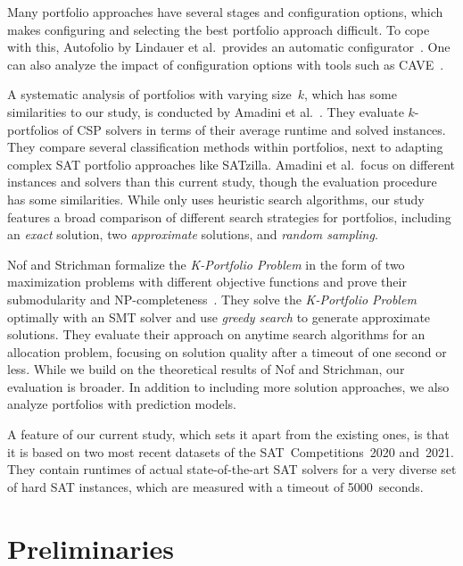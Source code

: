 \documentclass[conference]{IEEEtran}
\begin{document}
Many portfolio approaches have several stages and configuration options, which makes configuring and selecting the best portfolio approach difficult.
To cope with this, Autofolio by Lindauer et al.\ provides an automatic configurator~\cite{lindauer2015autofolio}.
One can also analyze the impact of configuration options with tools such as CAVE~\cite{biedenkapp2018cave}.

A systematic analysis of portfolios with varying size~$k$, which has some similarities to our study, is conducted by Amadini et al.~\cite{amadini2014empirical, amadini2016extensive}.
They evaluate $k$-portfolios of CSP solvers in terms of their average runtime and solved instances. 
They compare several classification methods within portfolios, next to adapting complex SAT portfolio approaches like SATzilla. 
Amadini et al.\ focus on different instances and solvers than this current study, though the evaluation procedure has some similarities.
While \cite{amadini2014empirical} only uses heuristic search algorithms, our study features a broad comparison of different search strategies for portfolios, including an \emph{exact} solution, two \emph{approximate} solutions, and \emph{random sampling}. 

Nof and Strichman formalize the \emph{K-Portfolio Problem} in the form of two maximization problems with different objective functions and prove their submodularity and NP-completeness~\cite{nof2020real}. 
They solve the \emph{K-Portfolio Problem} optimally with an SMT solver and use \emph{greedy search} to generate approximate solutions.
They evaluate their approach on anytime search algorithms for an allocation problem, focusing on solution quality after a timeout of one second or less. 
While we build on the theoretical results of Nof and Strichman, our evaluation is broader. 
In addition to including more solution approaches, we also analyze portfolios with prediction models.

A feature of our current study, which sets it apart from the existing ones, is that it is based on two most recent datasets of the SAT~Competitions~2020 and~2021. 
They contain runtimes of actual state-of-the-art SAT solvers for a very diverse set of hard SAT instances, which are measured with a timeout of 5000~seconds.

\section{Preliminaries}
\label{sec:preliminaries}
\end{document}
